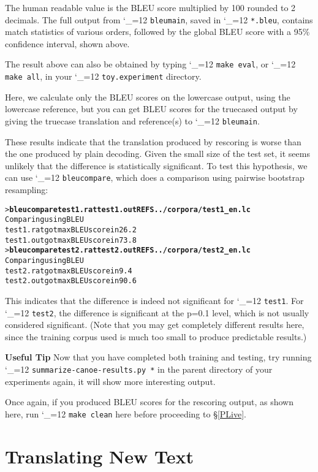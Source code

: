 \documentclass[11pt,letterpaper]{article}
\def\code{\begingroup\catcode`\_=12 \codex}
\newcommand{\codex}[1]{\texttt{#1}\endgroup}
\newcommand{\tip}{\textbf{Useful Tip \large{\ding{43}} }}
\newcommand{\margintip}{\marginpar[{\textbf{Tip \large{\ding{43}}}}]{\textbf{\reflectbox{\large{\ding{43}}} Tip}}}
\newcommand{\tipend}{\textbf{ \reflectbox{\large{\ding{43}}}}}
\begin{document}
The human readable value is the BLEU score multiplied by 100 rounded to 2
decimals. The full output from \code{bleumain}, saved in \code{*.bleu},
contains match statistics of various orders, followed by the global BLEU score
with a 95\% confidence interval, shown above.

The result above can also be obtained by typing \code{make eval}, or
\code{make all}, in your \code{toy.experiment} directory.

Here, we calculate only the BLEU scores on the lowercase output, using the
lowercase reference, but you can get BLEU scores for the truecased output by
giving the truecase translation and reference(s) to \code{bleumain}.

These results indicate that the translation produced by rescoring is worse
than the one produced by plain decoding. Given the small size of the test set,
it seems unlikely that the difference is statistically significant. To test
this hypothesis, we can use \code{bleucompare}, which does a comparison using
pairwise bootstrap resampling:
\begin{small}
\begin{alltt}
   > \textbf{bleucompare test1.rat test1.out REFS ../corpora/test1_en.lc}
   Comparing using BLEU
   test1.rat got max BLEU score in 26.2% of samples
   test1.out got max BLEU score in 73.8% of samples
   > \textbf{bleucompare test2.rat test2.out REFS ../corpora/test2_en.lc}
   Comparing using BLEU
   test2.rat got max BLEU score in 9.4% of samples
   test2.out got max BLEU score in 90.6% of samples
\end{alltt}
\end{small}
This indicates that the difference is indeed not significant for \code{test1}.
For \code{test2}, the difference is significant at the p=0.1 level, which is
not usually considered significant.  (Note that you may get completely
different results here, since the training corpus used is much too small to
produce predictable results.)

\tip \margintip Now that you have completed both training and testing, try
running \code{summarize-canoe-results.py *} in the parent directory of your
experiments again, it will show more interesting output.  \tipend

Once again, if you produced BLEU scores for the rescoring output, as shown
here, run \code{make clean} here before proceeding to \S\ref{PLive}.

\section{Translating New Text} \label{NewText}
\end{document}
